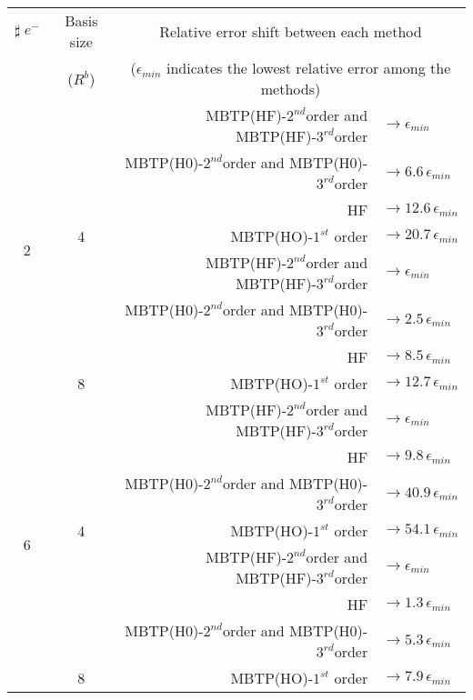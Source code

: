 \begin{table}[ht]
\centering      %
{\scriptsize
\begin{tabular}[c]{c|c|r l} 
\toprule[1pt]
\multicolumn{1}{c|}{$\sharp \; e^{-}$}  & \multicolumn{1}{c|}{Basis size} & \multicolumn{2}{c}{Relative error shift between each method}\\
\multicolumn{1}{c|}{} & \multicolumn{1}{c|}{($R^b$)}    & \multicolumn{2}{c}{($\epsilon_{min}$ indicates the lowest relative error among the methods)} \\
\hline
\multirow{8}{*}{2}&  	& MBTP(HF)-$2^{nd}$order and MBTP(HF)-$3^{rd}$order  & $\rightarrow \epsilon_{min}$ \\
		& 	&    MBTP(H0)-$2^{nd}$order and MBTP(H0)-$3^{rd}$order  & $\rightarrow 6.6 \, \epsilon_{min}$ \\ 
		& 	&    HF							& $\rightarrow 12.6 \, \epsilon_{min}$ \\ 
	& \multirow{-4}{*}{4}	&    MBTP(HO)-$1^{st}$ order		& $\rightarrow 20.7 \, \epsilon_{min}$ \\ \cline{2-4}
		&	& MBTP(HF)-$2^{nd}$order and MBTP(HF)-$3^{rd}$order  & $\rightarrow \epsilon_{min}$ \\ 
		&	&    MBTP(H0)-$2^{nd}$order and MBTP(H0)-$3^{rd}$order  & $\rightarrow 2.5 \, \epsilon_{min}$ \\ 
		&	&    HF							& $\rightarrow 8.5 \, \epsilon_{min}$ \\ 
	& \multirow{-4}{*}{8}	&    MBTP(HO)-$1^{st}$ order		& $\rightarrow 12.7 \, \epsilon_{min}$ \\ \cline{2-4}
\hline
\multirow{8}{*}{6} &	& MBTP(HF)-$2^{nd}$order and MBTP(HF)-$3^{rd}$order  & $\rightarrow \epsilon_{min}$ \\ 
		&	&    HF& $\rightarrow 9.8 \, \epsilon_{min}$ \\ 
		&	&    MBTP(H0)-$2^{nd}$order and MBTP(H0)-$3^{rd}$order  & $\rightarrow 40.9\, \epsilon_{min}$ \\ 
	& \multirow{-4}{*}{4}	&    MBTP(HO)-$1^{st}$ order		& $\rightarrow 54.1 \, \epsilon_{min}$ \\ \cline{2-4}
		&	& MBTP(HF)-$2^{nd}$order and MBTP(HF)-$3^{rd}$order  & $\rightarrow \epsilon_{min}$ \\ 
		&	&    HF& $\rightarrow 1.3 \, \epsilon_{min}$ \\ 
		&	&   MBTP(H0)-$2^{nd}$order and MBTP(H0)-$3^{rd}$order  & $\rightarrow 5.3\, \epsilon_{min}$ \\ 
	& \multirow{-4}{*}{8}	&    MBTP(HO)-$1^{st}$ order		& $\rightarrow 7.9 \, \epsilon_{min}$ \\ \cline{2-4}

\end{tabular}}
\end{table}
